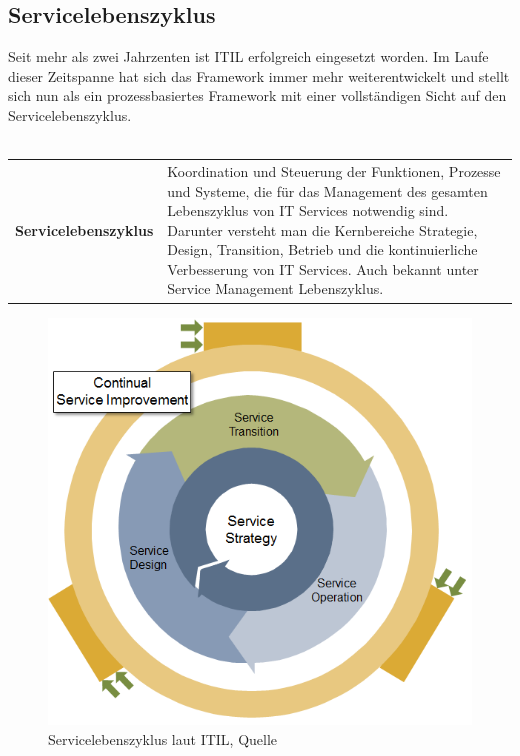 {\subsection{Servicelebenszyklus}
\label{chap: Servicelebenszyklus}
\noindent
Seit mehr als zwei Jahrzenten ist ITIL erfolgreich eingesetzt worden. Im Laufe dieser Zeitspanne hat sich das Framework immer mehr
weiterentwickelt und stellt sich nun als ein prozessbasiertes Framework mit einer vollständigen Sicht auf den Servicelebenszyklus.
\\
\noindent
\\
\begin{tabular}{l|p{10cm}}
    \textbf{Servicelebenszyklus} & Koordination und Steuerung der Funktionen, Prozesse und Systeme, die für das Management des gesamten 
    Lebenszyklus von IT Services notwendig sind. Darunter versteht man die Kernbereiche Strategie, Design, Transition, Betrieb und die kontinuierliche
    Verbesserung von IT Services. Auch bekannt unter Service Management Lebenszyklus.
\end{tabular}

\begin{figure}[H]
    \centering
    \captionsetup{justification=centering,margin=2cm}
    \includegraphics[scale=0.5]{images/ITIL/servicelebenszyklus}
    \caption[Servicelebenszyklus laut ITIL]{Servicelebenszyklus laut ITIL, Quelle\footnotemark}
\end{figure}

}
